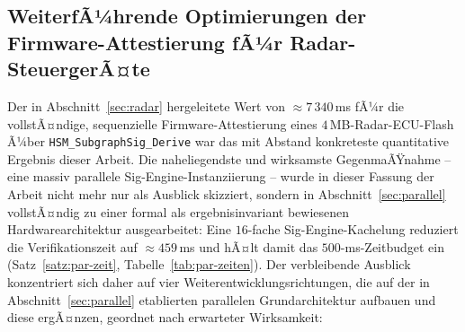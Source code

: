 ﻿\documentclass[a4paper,12pt]{article}
\theoremstyle{definition}
\begin{document}
\subsection{WeiterfÃ¼hrende Optimierungen der Firmware-Attestierung fÃ¼r Radar-SteuergerÃ¤te}
\label{sec:ausblick-radar}

Der in Abschnitt~\ref{sec:radar} hergeleitete Wert von $\approx 7\,340$\,ms fÃ¼r die vollstÃ¤ndige, sequenzielle Firmware-Attestierung eines $4$\,MB-Radar-ECU-Flash Ã¼ber \texttt{HSM\_SubgraphSig\_Derive} war das mit Abstand konkreteste quantitative Ergebnis dieser Arbeit. Die naheliegendste und wirksamste GegenmaÃŸnahme -- eine massiv parallele Sig-Engine-Instanziierung -- wurde in dieser Fassung der Arbeit nicht mehr nur als Ausblick skizziert, sondern in Abschnitt~\ref{sec:parallel} vollstÃ¤ndig zu einer formal als ergebnisinvariant bewiesenen Hardwarearchitektur ausgearbeitet: Eine $16$-fache Sig-Engine-Kachelung reduziert die Verifikationszeit auf $\approx 459$\,ms und hÃ¤lt damit das $500$-ms-Zeitbudget ein (Satz~\ref{satz:par-zeit}, Tabelle~\ref{tab:par-zeiten}). Der verbleibende Ausblick konzentriert sich daher auf vier Weiterentwicklungsrichtungen, die auf der in Abschnitt~\ref{sec:parallel} etablierten parallelen Grundarchitektur aufbauen und diese ergÃ¤nzen, geordnet nach erwarteter Wirksamkeit:
\end{document}
